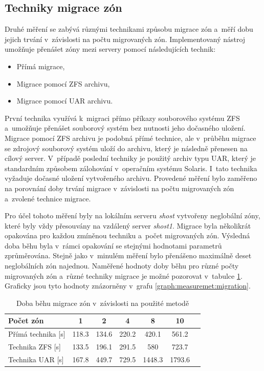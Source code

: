 \subsection{Techniky migrace zón}
\label{chapter:measurement:migration}
Druhé měření se zabývá různými technikami způsobu migrace zón a~měří dobu jejich trvání v~závislosti na počtu migrovaných zón.
Implementovaný nástroj umožňuje přenášet zóny mezi servery pomocí následujících technik:
\begin{itemize}
 \item Přímá migrace,
 \item Migrace pomocí ZFS archivu,
 \item Migrace pomocí UAR archivu.
\end{itemize}
První technika využívá k~migraci přímo příkazy souborového systému ZFS a~umožňuje přenášet souborový systém bez nutnosti jeho dočasného
uložení. Migrace pomocí ZFS archivu je podobná přímé technice, ale v~průběhu migrace se zdrojový souborový systém uloží do archivu,
který je následně přenesen na cílový server. V~případě poslední techniky je použitý archiv typu UAR, který je standardním způsobem zálohování
v~operačním systému Solaris. I~tato technika vyžaduje dočasné uložení vytvořeného archivu. Provedené měření bylo zaměřeno
na porovnání doby trvání migrace v~závislosti na počtu migrovaných zón a~zvolené technice migrace.

Pro účel tohoto měření byly na lokálním serveru \textit{shost} vytvořeny neglobální zóny, které byly vždy přesouvány na vzdálený
server \textit{shost1}. Migrace byla několikrát opakována pro každou zmíněnou techniku a~počet migrovaných zón. Výsledná
doba běhu byla v~rámci opakování se stejnými hodnotami parametrů zprůměrována. Stejně jako v~minulém měření bylo přenášeno maximálně
deset neglobálních zón najednou. Naměřené hodnoty doby běhu pro různé počty migrovaných zón a~různé techniky migrace je možné
pozorovat v~tabulce \ref{table:measuremet:migration}. Graficky jsou tyto hodnoty znázorněny v~grafu \ref{graph:measuremet:migration}.
\begin{table}
  \centering
  \label{table:measuremet:migration}
  \caption{Doba běhu migrace zón v~závislosti na použité metodě}
  \begin{tabular}{ l | c c c c c c}
   Počet zón & 1 & 2 & 4 & 8 & 10 &   \\ \hline
   Přímá technika [s] & 118.3 & 134.6 & 220.2 & 420.1 & 561.2 & \\
   Technika ZFS [s] & 133.5 & 196.1 & 291.5 & 580 & 723.7 & \\
   Technika UAR [s] & 167.8 & 449.7 & 729.5 & 1448.3 & 1793.6 & \\
  \end{tabular}
\end{table}

